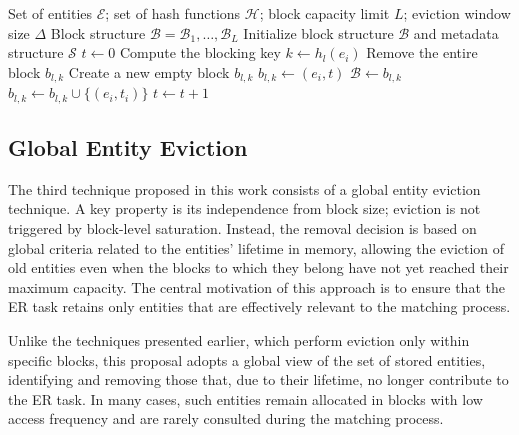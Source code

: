 \documentclass{ieeeaccess}
\begin{document}
\begin{algorithm}[H]
\caption{Block Eviction Strategy}
\label{alg:blocking_general}
\begin{algorithmic}[1]
\Require Set of entities $\mathcal{E}$; set of hash functions $\mathcal{H}$; block capacity limit $L$; eviction window size $\Delta$
\Ensure Block structure $\mathcal{B} = {\mathcal{B}_1, \dots, \mathcal{B}_L}$
\State Initialize block structure $\mathcal{B}$ and metadata structure $\mathcal{S}$ 
\State $t \gets 0$ 
        \State Compute the blocking key $k \gets h_l(e_i)$   
                \State Remove the entire block $b_{l,k}$ 
                \State Create a new empty block $b_{l,k}$        
            \EndIf
            \State $b_{l,k} \gets (e_i, t)$
        \Else
            \State $\mathcal{B} \gets b_{l,k}$ 
            \State $b_{l,k} \gets b_{l,k} \cup \{(e_i, t_i)\}$
        \EndIf
    \EndFor
    \State $t \gets t + 1$
\EndFor
\end{algorithmic}
\end{algorithm}

\subsection{Global Entity Eviction} \label{subsec:descarte-entidades-global}

The third technique proposed in this work consists of a global entity eviction technique. A key property is its independence from block size; eviction is not triggered by block-level saturation. Instead, the removal decision is based on global criteria related to the entities’ lifetime in memory, allowing the eviction of old entities even when the blocks to which they belong have not yet reached their maximum capacity. The central motivation of this approach is to ensure that the ER task retains only entities that are effectively relevant to the matching process.

Unlike the techniques presented earlier, which perform eviction only within specific blocks, this proposal adopts a global view of the set of stored entities, identifying and removing those that, due to their lifetime, no longer contribute to the ER task. In many cases, such entities remain allocated in blocks with low access frequency and are rarely consulted during the matching process.
\end{document}
